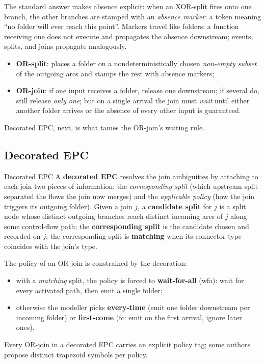 The standard answer makes absence explicit: when an XOR-split fires onto one branch, the other branches are stamped with an \emph{absence marker}: a token meaning ``no folder will ever reach this point''. Markers travel like folders: a function receiving one does not execute and propagates the absence downstream; events, splits, and joins propagate analogously.

\begin{itemize}
  \item \textbf{OR-split}: places a folder on a nondeterministically chosen \emph{non-empty subset} of the outgoing arcs and stamps the rest with absence markers;
  \item \textbf{OR-join}: if one input receives a folder, release one downstream; if several do, still release \emph{only one}; but on a single arrival the join must \emph{wait} until either another folder arrives or the absence of every other input is guaranteed.
\end{itemize}
Decorated EPC, next, is what tames the OR-join's waiting rule.

\subsection{Decorated EPC}

\begin{definitionbox}{Decorated EPC}
A \textbf{decorated EPC} resolves the join ambiguities by attaching to each join two pieces of information: the \emph{corresponding split} (which upstream split separated the flows the join now merges) and the \emph{applicable policy} (how the join triggers its outgoing folder). Given a join $j$, a \textbf{candidate split} for $j$ is a split node whose distinct outgoing branches reach distinct incoming arcs of $j$ along some control-flow path; the \textbf{corresponding split} is the candidate chosen and recorded on $j$; the corresponding split is \textbf{matching} when its connector type coincides with the join's type.
\end{definitionbox}

The policy of an OR-join is constrained by the decoration:
\begin{itemize}
  \item with a \emph{matching} split, the policy is forced to \textbf{wait-for-all} (wfa): wait for every activated path, then emit a single folder;
  \item otherwise the modeller picks \textbf{every-time} (emit one folder downstream per incoming folder) or \textbf{first-come} (fc: emit on the first arrival, ignore later ones).
\end{itemize}
Every OR-join in a decorated EPC carries an explicit policy tag; some authors propose distinct trapezoid symbols per policy.

